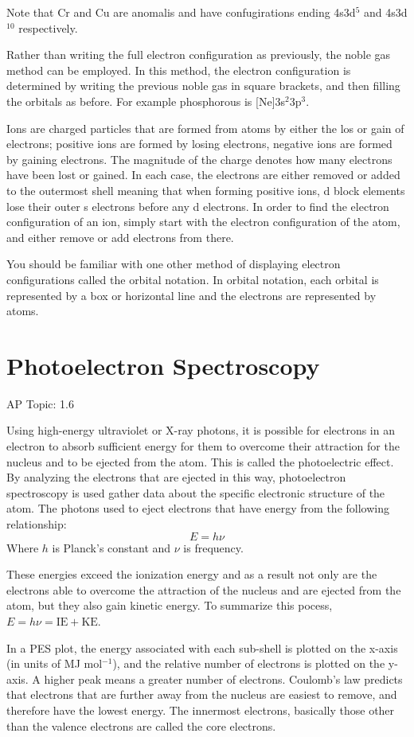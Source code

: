 \documentclass[../chem.tex]{subfiles}
\begin{document}
Note that Cr and Cu are anomalis and have confugirations ending 4s3d$^5$ and 4s3d$^{10}$ respectively.

Rather than writing the full electron configuration as previously, the noble gas method can be employed. In this method, the electron 
configuration is determined by writing the previous noble gas in square brackets, and then filling the orbitals as before. For example phosphorous is [Ne]3s$^2$3p$^3$.

Ions are charged particles that are formed from atoms by either the los or gain of electrons; positive ions are formed by losing electrons, negative ions are formed by gaining electrons. The magnitude of the charge 
denotes how many electrons have been lost or gained. In each case, the electrons are either removed or added to the outermost shell meaning that when 
forming positive ions, d block elements lose their outer s electrons before any d electrons. In order to find the electron configuration of an ion, simply 
start with the electron configuration of the atom, and either remove or add electrons from there.

You should be familiar with one other method of displaying electron configurations called the orbital notation. In orbital notation, 
each orbital is represented by a box or horizontal line and the electrons are represented by atoms.
\section{Photoelectron Spectroscopy}
AP Topic: 1.6

Using high-energy ultraviolet or X-ray photons, it is possible for electrons in an electron to absorb sufficient energy for them to overcome their attraction for the nucleus 
and to be ejected from the atom. This is called the photoelectric effect. By analyzing the electrons that are ejected in this way, photoelectron spectroscopy is used 
gather data about the specific electronic structure of the atom. The photons used to eject electrons that have energy from the following relationship:
\[E=h\nu\]
Where $h$ is Planck's constant and $\nu$ is frequency. 

These energies exceed the ionization energy and as a result not only are the electrons able to overcome the attraction of the nucleus and are ejected from the atom,
but they also gain kinetic energy. To summarize this pocess, $E=h\nu = \text{IE}+\text{KE}$. 

In a PES plot, the energy associated with each sub-shell is plotted on the x-axis (in units of MJ mol$^{-1}$), and the relative number of electrons 
is plotted on the y-axis. A higher peak means a greater number of electrons. Coulomb's law predicts that electrons that are further away from the nucleus 
are easiest to remove, and therefore have the lowest energy. The innermost electrons, basically those other than the valence electrons are called the core electrons.
\end{document}
